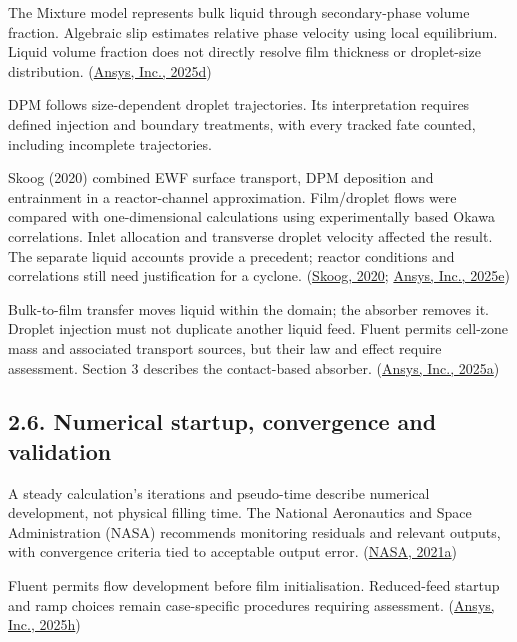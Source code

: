 \documentclass[
  12pt,
  a4paper,
]{article}
\begin{document}
The Mixture model represents bulk liquid through secondary-phase volume
fraction. Algebraic slip estimates relative phase velocity using local
equilibrium. Liquid volume fraction does not directly resolve film
thickness or droplet-size distribution.
(\href{https://ansyshelp.ansys.com/public/Views/Secured/corp/v252/en/flu_th/flu_th_sec_drift_oview.html}{Ansys,
Inc., 2025d})

DPM follows size-dependent droplet trajectories. Its interpretation
requires defined injection and boundary treatments, with every tracked
fate counted, including incomplete trajectories.

Skoog (2020) combined EWF surface transport, DPM deposition and
entrainment in a reactor-channel approximation. Film/droplet flows were
compared with one-dimensional calculations using experimentally based
Okawa correlations. Inlet allocation and transverse droplet velocity
affected the result. The separate liquid accounts provide a precedent;
reactor conditions and correlations still need justification for a
cyclone.
(\href{https://www.diva-portal.org/smash/get/diva2:1452100/FULLTEXT02.pdf}{Skoog,
2020};
\href{https://ansyshelp.ansys.com/public/views/secured/corp/v252/en/flu_ug/flu_ug_models_wallfilm.html}{Ansys,
Inc., 2025e})

Bulk-to-film transfer moves liquid within the domain; the absorber
removes it. Droplet injection must not duplicate another liquid feed.
Fluent permits cell-zone mass and associated transport sources, but
their law and effect require assessment. Section 3 describes the
contact-based absorber.
(\href{https://ansyshelp.ansys.com/public/Views/Secured/corp/v252/en/flu_ug/flu_ug_bcs_sec_cell_zones.html}{Ansys,
Inc., 2025a})

\subsection{2.6. Numerical startup, convergence and
validation}\label{numerical-startup-convergence-and-validation}

A steady calculation's iterations and pseudo-time describe numerical
development, not physical filling time. The National Aeronautics and
Space Administration (NASA) recommends monitoring residuals and relevant
outputs, with convergence criteria tied to acceptable output error.
(\href{https://www.grc.nasa.gov/www/wind/valid/tutorial/iterconv.html}{NASA,
2021a})

Fluent permits flow development before film initialisation. Reduced-feed
startup and ramp choices remain case-specific procedures requiring
assessment.
(\href{https://ansyshelp.ansys.com/public/views/secured/corp/v252/en/flu_ug/flu_ug_ewf_sec_overview.html}{Ansys,
Inc., 2025h})
\end{document}
